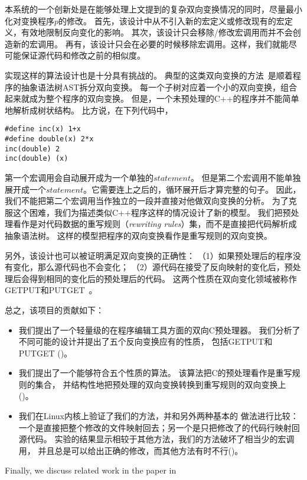
本系统的一个创新处是在能够处理上文提到的复杂双向变换情况的同时，尽量最小化对变换程序$p$的修改。
首先，该设计中从不引入新的宏定义或修改现有的宏定义，有效地限制反向变化的影响。
其次，该设计只会移除/修改宏调用而并不会创造新的宏调用。
再有，该设计只会在必要的时候移除宏调用。这样，我们就能尽可能保证源代码和修改之前的相似度。


实现这样的算法设计也是十分具有挑战的。
典型的这类双向变换的方法~\parencite{MaHNHT07,Voigtlander09bff,MMHT10}是顺着程序的抽象语法树AST拆分双向变换。
每一个子树对应着一个小的双向变换，组合起来就成为整个程序的双向变换。
但是，一个未预处理的C++的程序并不能简单地解析成树状结构。
比方说，在下列代码中，
\begin{lstlisting}
#define inc(x) 1+x
#define double(x) 2*x
inc(double) 2
inc(double) (x)
\end{lstlisting}
第一个宏调用会自动展开成为一个单独的$statement$。
但是第二个宏调用不能单独展开成一个$statement$。它需要连上之后的，循环展开后才算完整的句子。
因此，我们不能把第二个宏调用当作独立的一段并直接对他做双向变换的分析。
为了克服这个困难，我们为描述类似C++程序这样的情况设计了新的模型。
我们把预处理看作是对代码数据的重写规则（\emph{rewriting rules}）集，而不是直接把代码解析成抽象语法树。
这样的模型把程序的双向变换看作是重写规则的双向变换。


另外，该设计也可以被证明满足双向变换的正确性：
（1）如果预处理后的程序没有变化，那么源代码也不会变化；
（2）源代码在接受了反向映射的变化后，预处理后会得到相同的变化后的预处理后的代码。
这两个性质在双向变化领域被称作GETPUT和PUTGET~\parencite{Foster:2007}。

总之，该项目的贡献如下：
\begin{itemize}
\item 我们提出了一个轻量级的在程序编辑工具方面的双向C预处理器。
	我们分析了不同可能的设计并提出了五个反向变换应有的性质，
	包括GETPUT和PUTGET
	()。
\item 我们提出了一个能够符合五个性质的算法。
	该算法把C的预处理看作是重写规则的集合，
	并结构性地把预处理的双向变换转换到重写规则的双向变换上
	()。
\item 我们在Linux内核上验证了我们的方法，并和另外两种基本的
	做法进行比较：一个是直接把整个修改的文件映射回去；另一个是只把修改了的代码行映射回源代码。
	实验的结果显示相较于其他方法，我们的方法破坏了相当少的宏调用，
	并且总是可以给出正确的修改，而其他方法有时不行()。
\end{itemize}


Finally, we discuss related work in %
the paper in %